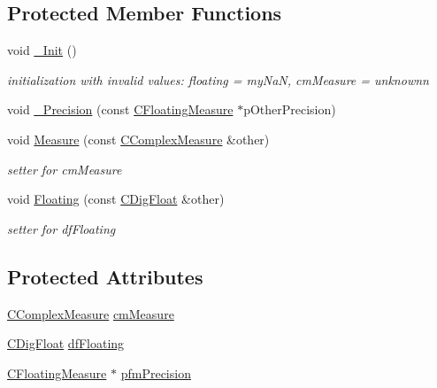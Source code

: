 \subsection*{Protected Member Functions}
\begin{DoxyCompactItemize}
\item 
void \hyperlink{classCFloatingMeasure_a1e8a7467d6435c4cf349198804617623}{\+\_\+\+Init} ()
\begin{DoxyCompactList}\small\item\em initialization with invalid values\+: floating = my\+NaN, cm\+Measure = unknownn \end{DoxyCompactList}\item 
void \hyperlink{classCFloatingMeasure_a8e16f55f29d0d4c4148307a1f5953fe3}{\+\_\+\+Precision} (const \hyperlink{classCFloatingMeasure}{C\+Floating\+Measure} $\ast$p\+Other\+Precision)
\item 
void \hyperlink{classCFloatingMeasure_af35c54ac06b1c8ddca86390360559548}{Measure} (const \hyperlink{classCComplexMeasure}{C\+Complex\+Measure} \&other)
\begin{DoxyCompactList}\small\item\em setter for cm\+Measure \end{DoxyCompactList}\item 
void \hyperlink{classCFloatingMeasure_aa33fe952e9c01f5f76cef5e6f0d03864}{Floating} (const \hyperlink{classCDigFloat}{C\+Dig\+Float} \&other)
\begin{DoxyCompactList}\small\item\em setter for df\+Floating \end{DoxyCompactList}\end{DoxyCompactItemize}
\subsection*{Protected Attributes}
\begin{DoxyCompactItemize}
\item 
\hyperlink{classCComplexMeasure}{C\+Complex\+Measure} \hyperlink{classCFloatingMeasure_a3a23946016d1b7f41a1ecf05f4d5d5c6}{cm\+Measure}
\item 
\hyperlink{classCDigFloat}{C\+Dig\+Float} \hyperlink{classCFloatingMeasure_aa0cec9966c6c08db75c493e44396cfc2}{df\+Floating}
\item 
\hyperlink{classCFloatingMeasure}{C\+Floating\+Measure} $\ast$ \hyperlink{classCFloatingMeasure_a6bc7bd6e563e69cbf29692cd97153115}{pfm\+Precision}
\end{DoxyCompactItemize}
